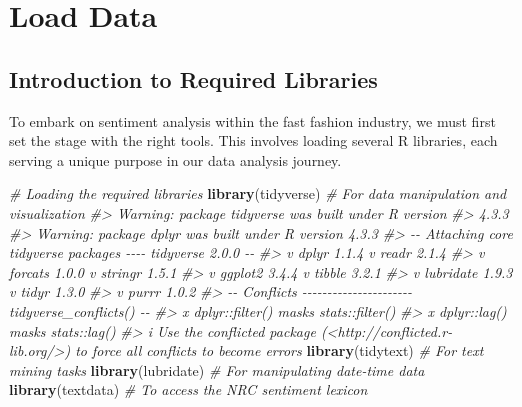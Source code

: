 \documentclass[
]{book}
\newenvironment{Shaded}{\begin{snugshade}}{\end{snugshade}}
\newcommand{\CommentTok}[1]{\textcolor[rgb]{0.56,0.35,0.01}{\textit{#1}}}
\newcommand{\FunctionTok}[1]{\textcolor[rgb]{0.13,0.29,0.53}{\textbf{#1}}}
\newcommand{\NormalTok}[1]{#1}
\begin{document}
\hypertarget{load-data}{%
\section{Load Data}\label{load-data}}

\hypertarget{introduction-to-required-libraries-1}{%
\subsection*{Introduction to Required Libraries}\label{introduction-to-required-libraries-1}}

To embark on sentiment analysis within the fast fashion industry, we must first set the stage with the right tools. This involves loading several R libraries, each serving a unique purpose in our data analysis journey.

\begin{Shaded}
\begin{Highlighting}[]
\CommentTok{\# Loading the required libraries}
\FunctionTok{library}\NormalTok{(tidyverse)  }\CommentTok{\# For data manipulation and visualization}
\CommentTok{\#\textgreater{} Warning: package \textquotesingle{}tidyverse\textquotesingle{} was built under R version}
\CommentTok{\#\textgreater{} 4.3.3}
\CommentTok{\#\textgreater{} Warning: package \textquotesingle{}dplyr\textquotesingle{} was built under R version 4.3.3}
\CommentTok{\#\textgreater{} {-}{-} Attaching core tidyverse packages {-}{-}{-}{-} tidyverse 2.0.0 {-}{-}}
\CommentTok{\#\textgreater{} v dplyr     1.1.4     v readr     2.1.4}
\CommentTok{\#\textgreater{} v forcats   1.0.0     v stringr   1.5.1}
\CommentTok{\#\textgreater{} v ggplot2   3.4.4     v tibble    3.2.1}
\CommentTok{\#\textgreater{} v lubridate 1.9.3     v tidyr     1.3.0}
\CommentTok{\#\textgreater{} v purrr     1.0.2     }
\CommentTok{\#\textgreater{} {-}{-} Conflicts {-}{-}{-}{-}{-}{-}{-}{-}{-}{-}{-}{-}{-}{-}{-}{-}{-}{-}{-}{-}{-}{-} tidyverse\_conflicts() {-}{-}}
\CommentTok{\#\textgreater{} x dplyr::filter() masks stats::filter()}
\CommentTok{\#\textgreater{} x dplyr::lag()    masks stats::lag()}
\CommentTok{\#\textgreater{} i Use the conflicted package (\textless{}http://conflicted.r{-}lib.org/\textgreater{}) to force all conflicts to become errors}
\FunctionTok{library}\NormalTok{(tidytext)   }\CommentTok{\# For text mining tasks}
\FunctionTok{library}\NormalTok{(lubridate)  }\CommentTok{\# For manipulating date{-}time data}
\FunctionTok{library}\NormalTok{(textdata)   }\CommentTok{\# To access the NRC sentiment lexicon}
\end{Highlighting}
\end{Shaded}
\end{document}
